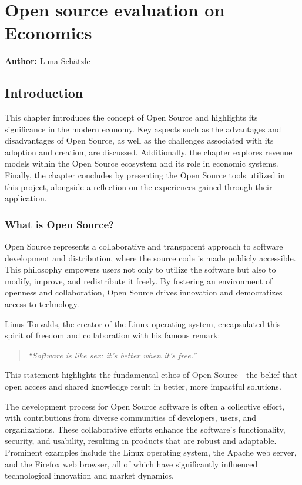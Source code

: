 \chapter{Open source evaluation on Economics}
\label{cha:Open_source_evaluation_Economics}
\textbf{Author:} Luna Schätzle

\section{Introduction}

This chapter introduces the concept of Open Source and highlights its significance in the modern economy. 
Key aspects such as the advantages and disadvantages of Open Source, as well as the challenges associated with its adoption and creation, are discussed. 
Additionally, the chapter explores revenue models within the Open Source ecosystem and its role in economic systems. 
Finally, the chapter concludes by presenting the Open Source tools utilized in this project, alongside a reflection on the experiences gained through their application.


\subsection{What is Open Source?}

Open Source represents a collaborative and transparent approach to software development and distribution, 
where the source code is made publicly accessible. This philosophy empowers users not only to utilize the software but also to modify, 
improve, and redistribute it freely. By fostering an environment of openness and collaboration, 
Open Source drives innovation and democratizes access to technology.

Linus Torvalds, the creator of the Linux operating system, encapsulated this spirit of freedom and collaboration with his famous remark:

\begin{quote}
    \textit{“Software is like sex: it's better when it's free.”}
    \author{Linus Torvalds}
\end{quote}

\cite{Linus_Torvalds_quote_open_source}

This statement highlights the fundamental ethos of Open Source—the belief that open access and shared knowledge result in better, more impactful solutions.


The development process for Open Source software is often a collective effort, 
with contributions from diverse communities of developers, users, and organizations. 
These collaborative efforts enhance the software's functionality, security, and usability, 
resulting in products that are robust and adaptable. Prominent examples include the Linux operating system, 
the Apache web server, and the Firefox web browser, all of which have significantly influenced technological innovation and market dynamics.

